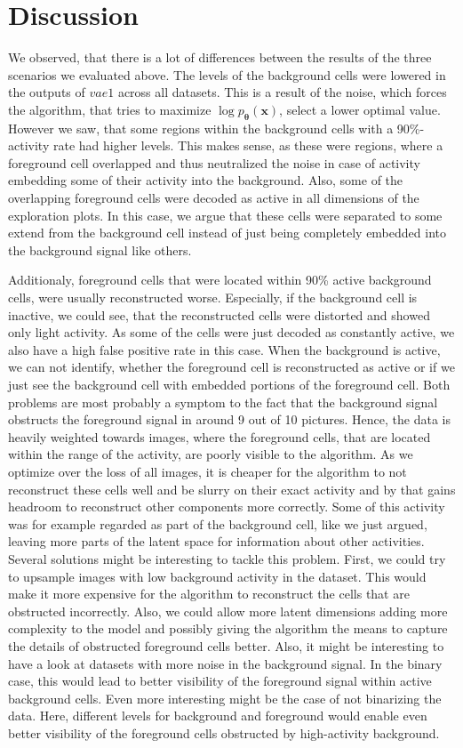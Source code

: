 \documentclass[12pt]{report}
\theoremstyle{definition}
\begin{document}
\section{Discussion}
We observed, that there is a lot of differences between the results of the three scenarios we evaluated above.
The levels of the background cells were lowered in the outputs of $vae1$ across all datasets. This is a result of the noise, which forces the algorithm, that tries to maximize $\log p_{\pmb{\theta}}(\mathbf{x})$, select a lower optimal value. However we saw, that some regions within the background cells with a 90\%-activity rate had higher levels. This makes sense, as these were regions, where a foreground cell overlapped and thus neutralized the noise in case of activity embedding some of their activity into the background. Also, some of the overlapping foreground cells were decoded as active in all dimensions of the exploration plots. In this case, we argue that these cells were separated to some extend from the background cell instead of just being completely embedded into the background signal like others.

Additionaly, foreground cells that were located within 90\% active background cells, were usually reconstructed worse. Especially, if the background cell is inactive, we could see, that the reconstructed cells were distorted and showed only light activity. As some of the cells were just decoded as constantly active, we also have a high false positive rate in this case. When the background is active, we can not identify, whether the foreground cell is reconstructed as active or if we just see the background cell with embedded portions of the foreground cell.
Both problems are most probably a symptom to the fact that the background signal obstructs the foreground signal in around 9 out of 10 pictures. Hence, the data is heavily weighted towards images, where the foreground cells, that are located within the range of the activity, are poorly visible to the algorithm. As we optimize over the loss of all images, it is cheaper for the algorithm to not reconstruct these cells well and be slurry on their exact activity and by that gains headroom to reconstruct other components more correctly. Some of this activity was for example regarded as part of the background cell, like we just argued, leaving more parts of the latent space for information about other activities. Several solutions might be interesting to tackle this problem. First, we could try to upsample images with low background activity in the dataset. This would make it more expensive for the algorithm to reconstruct the cells that are obstructed incorrectly. Also, we could allow more latent dimensions adding more complexity to the model and possibly giving the algorithm the means to capture the details of obstructed foreground cells better. Also, it might be interesting to have a look at datasets with more noise in the background signal. In the binary case, this would lead to better visibility of the foreground signal within active background cells. Even more interesting might be the case of not binarizing the data. Here, different levels for background and foreground would enable even better visibility of the foreground cells obstructed by high-activity background.
\end{document}
